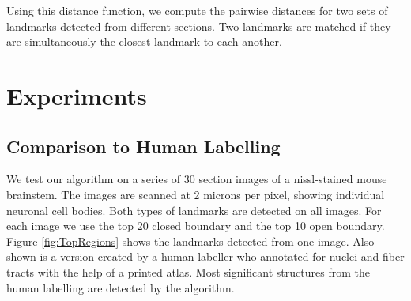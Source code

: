 \documentclass{llncs}
\begin{document}
Using this distance function, we compute the pairwise distances for two sets of landmarks detected from different sections. Two landmarks are matched if they are simultaneously the closest landmark to each another.

%
%


\section{Experiments}

\subsection{Comparison to Human Labelling}

We test our algorithm on a series of 30 section images of a nissl-stained mouse brainstem. The images are scanned at 2 microns per pixel, showing individual neuronal cell bodies. Both types of landmarks are detected on all images. For each image we use the top 20 closed boundary and the top 10 open boundary. Figure \ref{fig:TopRegions} shows the landmarks detected from one image. Also shown is a version created by a human labeller who annotated for nuclei and fiber tracts with the help of a printed atlas. Most significant structures from the human labelling are detected by the algorithm.

\end{document}
